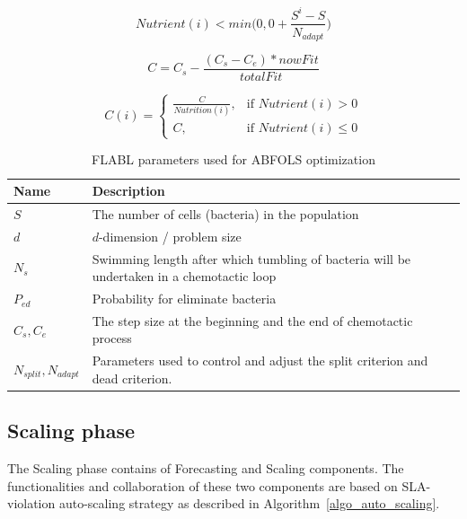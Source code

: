 \documentclass[runningheads]{llncs}
\begin{document}
\begin{equation} \label{eq_dead}
Nutrient(i) < \displaystyle min\Big( 0, 0 + \frac{S^i - S}{ N_{adapt} } \Big)
\end{equation}

\begin{equation} \label{eq_step_size_general}
C = \displaystyle C_s - \frac{ (C_s - C_e) * nowFit }{ totalFit } 
\end{equation}

\begin{equation} \label{eq_step_size_i}
C(i) = \begin{cases}  \displaystyle \frac{C}{Nutrition(i)} , & \mbox{if } Nutrient(i) > 0\\ C, & \mbox{if } Nutrient(i) \leq 0 \end{cases}
\end{equation}
\normalsize

\begin{table}[!ht]
\begin{center}
\begin{tabular}{ |C{2cm}| C{10cm} | } 
\hline
\textbf{Name} & \textbf{Description} \\ \hline
$S$ & The number of cells (bacteria) in the population \\ \hline
$d$ & $d$-dimension / problem size \\ \hline
$N_s$ & Swimming length after which tumbling of bacteria will be undertaken in a chemotactic loop \\ \hline
$P_{ed}$ & Probability for eliminate bacteria \\ \hline
$C_s, C_e$ & The step size at the beginning and the end of chemotactic process\\ \hline
$N_{split}, N_{adapt}$ & Parameters used to control and adjust the split criterion and dead criterion. \\ \hline
\end{tabular}
\end{center}
\caption{FLABL parameters used for ABFOLS optimization}
\label{table:bfo_paras}
\end{table}




\subsection{Scaling phase}
\label{scaling_phase}

The Scaling phase contains of Forecasting and Scaling components. The functionalities and collaboration of these two components are based on SLA-violation auto-scaling strategy as described in Algorithm~\ref{algo_auto_scaling}.
\end{document}
